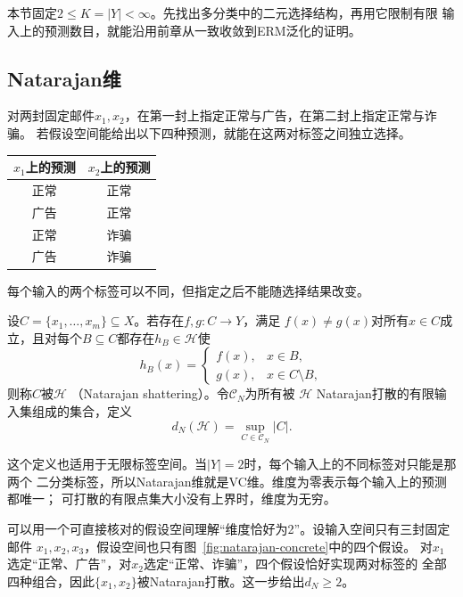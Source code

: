 本节固定$2\leq K=|Y|<\infty$。先找出多分类中的二元选择结构，再用它限制有限
输入上的预测数目，就能沿用前章从一致收敛到ERM泛化的证明。

\subsection{Natarajan维}

对两封固定邮件$x_1,x_2$，在第一封上指定正常与广告，在第二封上指定正常与诈骗。
若假设空间能给出以下四种预测，就能在这两对标签之间独立选择。
\begin{center}
\begin{tabular}{cc}
\toprule
$x_1$上的预测 & $x_2$上的预测\\
\midrule
正常 & 正常\\
广告 & 正常\\
正常 & 诈骗\\
广告 & 诈骗\\
\bottomrule
\end{tabular}
\end{center}
每个输入的两个标签可以不同，但指定之后不能随选择结果改变。

\begin{definition}[Natarajan打散与Natarajan维]
\label{def:natarajan-dimension}
设$C=\{x_1,\ldots,x_m\}\subseteq X$。若存在$f,g:C\to Y$，满足
$f(x)\neq g(x)$对所有$x\in C$成立，且对每个$B\subseteq C$都存在$h_B\in\mathcal H$使
\begin{equation}
 h_B(x)=\begin{cases}f(x),&x\in B,\\g(x),&x\in C\setminus B,\end{cases}
 \label{eq:natarajan-shattering}
\end{equation}
则称$C$被$\mathcal H$ （Natarajan shattering）。令$\mathcal C_N$为所有被
$\mathcal H$ Natarajan打散的有限输入集组成的集合，定义
\[
 d_N(\mathcal H)=\sup_{C\in\mathcal C_N}|C|.
\]
\end{definition}

这个定义也适用于无限标签空间。当$|Y|=2$时，每个输入上的不同标签对只能是那两个
二分类标签，所以Natarajan维就是VC维。维度为零表示每个输入上的预测都唯一；
可打散的有限点集大小没有上界时，维度为无穷。

可以用一个可直接核对的假设空间理解“维度恰好为2”。设输入空间只有三封固定邮件
$x_1,x_2,x_3$，假设空间也只有图~\ref{fig:natarajan-concrete}中的四个假设。
对$x_1$选定“正常、广告”，对$x_2$选定“正常、诈骗”，四个假设恰好实现两对标签的
全部四种组合，因此$\{x_1,x_2\}$被Natarajan打散。这一步给出$d_N\geq2$。

